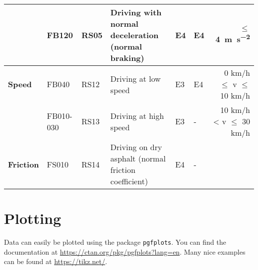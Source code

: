 \begin{table}[!h]
\begin{adjustbox}{max width=\textwidth}
\begin{tabular}{l|l|l|p{16.59em}|l|l|r}
            \cmidrule{2-7}                               & \cellcolor[rgb]{ .851,  .851,  .851}FB120     & \cellcolor[rgb]{ .851,  .851,  .851}RS05 & \cellcolor[rgb]{ .851,  .851,  .851}Driving with normal deceleration (normal braking) & \cellcolor[rgb]{ .851,  .851,  .851}E4 & \cellcolor[rgb]{ .851,  .851,  .851}E4 & \multicolumn{1}{p{9.955em}|}{\cellcolor[rgb]{ .851,  .851,  .851}$\leq$ \SI{4}{\metre\per\second\squared}} \\
            \midrule
            \multicolumn{1}{p{7.455em}|}{\textbf{Speed}} & FB040                                         & RS12                                     & Driving at low speed                                                                  & E3                                     & E4                                     & \multicolumn{1}{p{9.955em}|}{0 km/h $\leq$ v $\leq$ 10 km/h}                                               \\
            \cmidrule{2-7}                               & \cellcolor[rgb]{ .851,  .851,  .851}FB010-030 & \cellcolor[rgb]{ .851,  .851,  .851}RS13 & \cellcolor[rgb]{ .851,  .851,  .851}Driving at high speed                             & \cellcolor[rgb]{ .851,  .851,  .851}E3 & \cellcolor[rgb]{ .851,  .851,  .851}-  & \multicolumn{1}{p{9.955em}|}{\cellcolor[rgb]{ .851,  .851,  .851}10 km/h < v $\leq$ 30 km/h}               \\
            \midrule
            \multicolumn{1}{l|}{\textbf{Friction}}       & FS010                                         & RS14                                     & Driving on dry asphalt (normal friction coefficient)                                  & E4                                     & -                                      &                                                                                                            \\
        \end{tabular}%
    \end{adjustbox}
\end{table}


\clearpage

\section{Plotting}
\label{sec:Plotting}

Data can easily be plotted using the package \texttt{pgfplots}. You can find the documentation at \url{https://ctan.org/pkg/pgfplots?lang=en}. Many nice examples can be found at \url{https://tikz.net/}.

